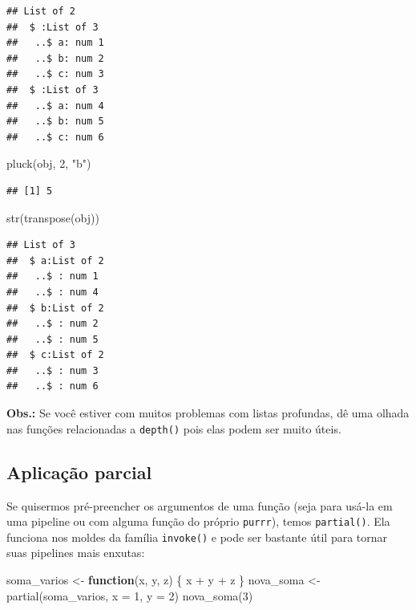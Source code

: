 \documentclass[
]{book}
\newenvironment{Shaded}{\begin{snugshade}}{\end{snugshade}}
\newcommand{\AttributeTok}[1]{\textcolor[rgb]{0.77,0.63,0.00}{#1}}
\newcommand{\ControlFlowTok}[1]{\textcolor[rgb]{0.13,0.29,0.53}{\textbf{#1}}}
\newcommand{\DecValTok}[1]{\textcolor[rgb]{0.00,0.00,0.81}{#1}}
\newcommand{\FunctionTok}[1]{\textcolor[rgb]{0.00,0.00,0.00}{#1}}
\newcommand{\NormalTok}[1]{#1}
\newcommand{\OtherTok}[1]{\textcolor[rgb]{0.56,0.35,0.01}{#1}}
\newcommand{\SpecialCharTok}[1]{\textcolor[rgb]{0.00,0.00,0.00}{#1}}
\newcommand{\StringTok}[1]{\textcolor[rgb]{0.31,0.60,0.02}{#1}}
\begin{document}
\begin{verbatim}
## List of 2
##  $ :List of 3
##   ..$ a: num 1
##   ..$ b: num 2
##   ..$ c: num 3
##  $ :List of 3
##   ..$ a: num 4
##   ..$ b: num 5
##   ..$ c: num 6
\end{verbatim}

\begin{Shaded}
\begin{Highlighting}[]
\FunctionTok{pluck}\NormalTok{(obj, }\DecValTok{2}\NormalTok{, }\StringTok{"b"}\NormalTok{)}
\end{Highlighting}
\end{Shaded}

\begin{verbatim}
## [1] 5
\end{verbatim}

\begin{Shaded}
\begin{Highlighting}[]
\FunctionTok{str}\NormalTok{(}\FunctionTok{transpose}\NormalTok{(obj))}
\end{Highlighting}
\end{Shaded}

\begin{verbatim}
## List of 3
##  $ a:List of 2
##   ..$ : num 1
##   ..$ : num 4
##  $ b:List of 2
##   ..$ : num 2
##   ..$ : num 5
##  $ c:List of 2
##   ..$ : num 3
##   ..$ : num 6
\end{verbatim}

\textbf{Obs.:} Se você estiver com muitos problemas com listas profundas, dê uma olhada
nas funções relacionadas a \texttt{depth()} pois elas podem ser muito úteis.

\hypertarget{aplicauxe7uxe3o-parcial}{%
\subsection{Aplicação parcial}\label{aplicauxe7uxe3o-parcial}}

Se quisermos pré-preencher os argumentos de uma função (seja para usá-la em uma
pipeline ou com alguma função do próprio \texttt{purrr}), temos \texttt{partial()}. Ela funciona
nos moldes da família \texttt{invoke()} e pode ser bastante útil para tornar suas
pipelines mais enxutas:

\begin{Shaded}
\begin{Highlighting}[]
\NormalTok{soma\_varios }\OtherTok{\textless{}{-}} \ControlFlowTok{function}\NormalTok{(x, y, z) \{ x }\SpecialCharTok{+}\NormalTok{ y }\SpecialCharTok{+}\NormalTok{ z \}}
\NormalTok{nova\_soma }\OtherTok{\textless{}{-}} \FunctionTok{partial}\NormalTok{(soma\_varios, }\AttributeTok{x =} \DecValTok{1}\NormalTok{, }\AttributeTok{y =} \DecValTok{2}\NormalTok{)}
\FunctionTok{nova\_soma}\NormalTok{(}\DecValTok{3}\NormalTok{)}
\end{Highlighting}
\end{Shaded}
\end{document}
